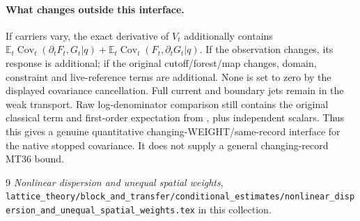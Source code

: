 \documentclass[11pt]{article}
\newcommand{\E}{\mathbb E}
\newcommand{\Cov}{\operatorname{Cov}}
\begin{document}
\paragraph{What changes outside this interface.}
If carriers vary, the exact derivative of $V_t$ additionally contains
$\E_t\Cov_t(\partial_tF_t,G_t|q)+\E_t\Cov_t(F_t,\partial_tG_t|q)$.
If the observation changes, its response is additional; if the original cutoff/forest/map
changes, domain, constraint and live-reference terms are additional. None is set to zero
by the displayed covariance cancellation. Full current and boundary jets remain in the
weak transport. Raw log-denominator comparison still contains the original classical term
and first-order expectation from \cite[(4.8)]{ND}, plus independent scalars.
Thus this gives a genuine quantitative changing-WEIGHT/same-record interface for the
native stopped covariance. It does not supply a general changing-record MT36 bound.
\begin{thebibliography}{9}
 \emph{Nonlinear dispersion and unequal spatial weights}, \texttt{lattice\_theory/block\_and\_transfer/conditional\_estimates/nonlinear\_dispersion\_and\_unequal\_spatial\_weights.tex} in this collection.
\end{thebibliography}
\end{document}
